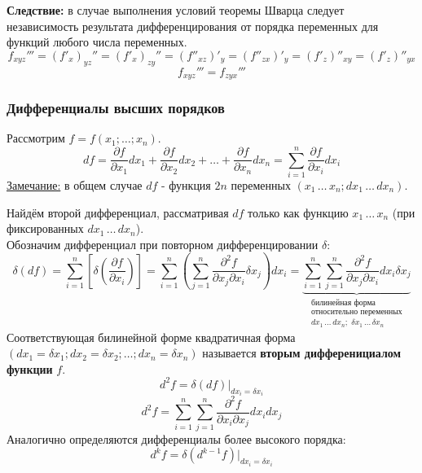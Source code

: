 \documentclass[12pt]{article}
\begin{document}
    \textbf{Следствие:} в случае выполнения условий теоремы Шварца следует независимость результата дифференцирования от порядка переменных для функций любого числа переменных.
    \[ f_{xyz}''' = (f'_x)_{yz}'' = (f'_x)_{zy}'' = (f''_{xz})'_y = (f''_{zx})'_y = (f'_z)''_{xy} = (f'_z)''_{yx} \]
    \[ f_{xyz}''' = f_{zyx}''' \]
    \subsubsection*{Дифференциалы высших порядков}
    Рассмотрим $f = f(x_1; \dots; x_n)$.
    \[ df = \frac{\partial f}{\partial x_1}dx_1 + \frac{\partial f}{\partial x_2}dx_2 + \dots + \frac{\partial f}{\partial x_n}dx_n = \sum_{i=1}^{n}\frac{\partial f}{\partial x_i}dx_i \]
    \underline{Замечание:} в общем случае $df$ - функция $2n$ переменных $(x_1\, \dots\, x_n; dx_1\, \dots\, dx_n)$.\par\noindent
    Найдём второй дифференциал, рассматривая $df$ только как функцию $x_1\, \dots\, x_n$ (при фиксированных $dx_1\, \dots\, dx_n$).\\
    Обозначим дифференциал при повторном дифференцировании $\delta$:
    \[ \delta(df) = \sum_{i=1}^{n}\left[ \delta(\frac{\partial f}{\partial x_i}) \right] = \sum_{i=1}^{n} ( \sum_{j=1}^{n} \frac{\partial^2 f}{\partial x_j \partial x_i} \delta x_j )dx_i = \underbrace{\sum_{i=1}^{n} \sum_{j=1}^{n} \frac{\partial^2 f}{\partial x_j \partial x_i} dx_i \delta x_j}_{\substack{\text{билинейная форма} \\ \text{относительно переменных} \\ dx_1\, \dots\, dx_n;\,\, \delta x_1\, \dots\, \delta x_n}} \]
    Соответствующая билинейной форме квадратичная форма $(dx_1 = \delta x_1; dx_2 = \delta x_2; \dots; dx_n = \delta x_n)$ называется \textbf{вторым дифференициалом функции} $f$.
    \[ d^2 f = \delta (df) \Big|_{dx_i = \delta x_i} \]
    \[ d^2 f = \sum_{i=1}^{n} \sum_{j=1}^{n} \frac{\partial^2 f}{\partial x_i \partial x_j} dx_i dx_j \]
    Аналогично определяются дифференциалы более высокого порядка:
    \[ d^k f = \delta(d^{k-1}f)\Big|_{dx_i = \delta x_i} \]
\end{document}
